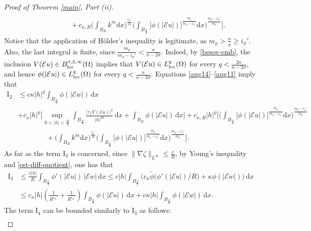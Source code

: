 \documentclass[leqno,11pt]{amsart}%
\numberwithin{equation}{section}
\def\d{\mathrm{d}}
\def\E{\mathcal{E}}
\def\dx{\d x}
\theoremstyle{definition}
\numberwithin{equation}{section}
\begin{document}
\begin{proof}[Proof of Theorem \ref{main}, Part (ii)]
\begin{align}
\\ \nonumber & {\qquad \qquad + c_{\kappa,R}\bigg(\int_{B_{
{
R}}}{ k}^{ {m}}\dx\bigg)^{\frac{i_\phi'}{{m}}}\bigg(\int_{B_{\frac R2}}\big[\phi(|\E u|)\big]^{\frac{ {m_\varrho}}{ {m_\varrho}-i_\phi'}}\dx\bigg)^{\frac{{m_\varrho}-i_\phi'}{{m_\varrho}}}
\Bigg]}.
\end{align}
Notice that the application of H\"older's inequality is legitimate, as 
${m_\varrho}>\frac{n}{\varrho}\geq i_\phi'$. Also, the last integral is finite, since $\frac{{m_\varrho}}{{m_\varrho}-i_\phi'}<\frac{n}{n-2\sigma}$.
Indeed, by \eqref{besov-emb}, the inclusion $V(\E u)\in B^{\sigma,2, \infty}_{\rm loc }(\Omega)$ implies that $V(\E u) \in L^q_{\rm loc}(\Omega)$ for every $q<\frac{2n}{n-2\sigma}$, and hence $\phi(|\E u|)\in L^{q}_{\rm loc}(\Omega)$ for every $q<\frac{n}{n-2\sigma}$. 
 Equations \eqref{aug14}--\eqref{aug11} imply that 
\begin{align}\label{I2-bound}
 \mathrm{I}_2
 &\le
 c\kappa|h|^{\varrho}\int_{B_{\frac R2}}\phi(|\E w|)\,\dx\\ \nonumber
 &+
 c_\kappa|h|^\varrho \Bigg[
 \sup_{0<|h|<\frac R2}
\int_{B_{\frac R2}}\frac{|\tau_hV(\E u)|^2}{|h|^{2\sigma}}\, \d x
 +\int_{B_{R}}\phi(|\E u|)\,\dx \Bigg]+
c_{\kappa,R}|h|^\varrho \Bigg[\bigg(\int_{B_{\frac R2}}\big[\phi(|\E u|)\big]^{\frac{  {m_\varrho}}{  {m_\varrho}-i_\phi'}}\dx\bigg)^{\frac{  {m_\varrho}-i_\phi'}{  {m_\varrho}}}
\\ \nonumber & \qquad \qquad +  \bigg(\int_{B_{R}}  {k}^{  {m}}\dx\bigg)^{\frac{i_\phi'}{  {m}}}\bigg(\int_{B_{\frac R2}}\big[\phi(|\E u|)\big]^{\frac{  {m_\varrho}}{  {m_\varrho}-i_\phi'}}\dx\bigg)^{\frac{  {m_\varrho}-i_\phi'}{  {m_\varrho}}}
\Bigg].
\end{align}
As far as the term $\mathrm{I}_3$ is concerned, since $\|\nabla\zeta\|_{L^\infty}\le \frac{c}{R}$, by Young's inequality and \eqref{est-diff-quotient}, one has that 
\begin{align}\label{Itre}
    \mathrm{I_3}&\le 
\frac{c|h|}{R}\int_{B_{\frac R2}}
  \phi'(|\E u|)\,|\E w| \,\dx
\le
c|h|\int_{B_{\frac R2}}
 \Big(
 c_\kappa\widetilde \phi\big(\phi'(|\E u|)/R\big) +\kappa\phi(|\E w|)\Big)\,\dx
\\ \nonumber &\le
c_\kappa |h|{\left(\frac{1}{R^{s_\phi'}}+\frac{1}{R^{i_\phi'}}\right)}\int_{B_{\frac R2}}\phi(|\E u|)\,\dx + c\kappa|h|\int_{B_{\frac R2}}
\phi(|\E w|)\,\dx.
\end{align}
The term $\mathrm{I}_4$ can be bounded  similarly to $\mathrm{I}_3$ as follows: 
\begin{align}\label{Iquattro}

\end{align}
\end{proof}
\end{document}
